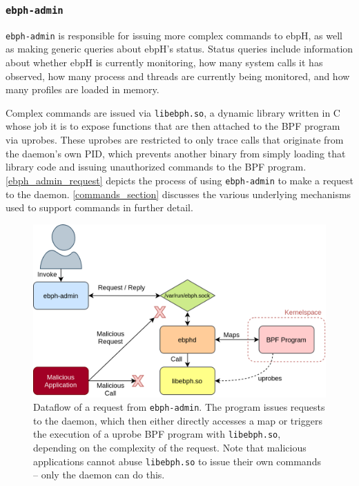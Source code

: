 \documentclass[
  12pt]{findlay}
\newcommand{\passthrough}[1]{#1}
\begin{document}

\hypertarget{ebph-admin}{%
\subsubsection{\texorpdfstring{\texttt{ebph-admin}}{ebph-admin}}\label{ebph-admin}}

\label{ebph_admin_sec}

\passthrough{\lstinline!ebph-admin!} is responsible for issuing more
complex commands to ebpH, as well as making generic queries about ebpH's
status. Status queries include information about whether ebpH is
currently monitoring, how many system calls it has observed, how many
process and threads are currently being monitored, and how many profiles
are loaded in memory.

Complex commands are issued via \passthrough{\lstinline!libebph.so!}, a
dynamic library written in C whose job it is to expose functions that
are then attached to the BPF program via uprobes. These uprobes are
restricted to only trace calls that originate from the daemon's own PID,
which prevents another binary from simply loading that library code and
issuing unauthorized commands to the BPF program.
\autoref{ebph_admin_request} depicts the process of using
\passthrough{\lstinline!ebph-admin!} to make a request to the daemon.
\autoref{commands_section} discusses the various underlying mechanisms
used to support commands in further detail.

\begin{figure}
    \caption[Dataflow of a request from \texttt{ebph-admin}]{
        Dataflow of a request from \texttt{ebph-admin}.
        The program issues requests to the daemon, which then either
        directly accesses a map or triggers the execution of a uprobe
        BPF program with \texttt{libebph.so}, depending on the complexity
        of the request. Note that malicious applications cannot abuse \texttt{libebph.so}
        to issue their own commands -- only the daemon can do this.
    }
    \label{ebph_admin_request}
    \includegraphics[width=.8\textwidth]{../figures/ebph-admin.png}
\end{figure}
\end{document}

